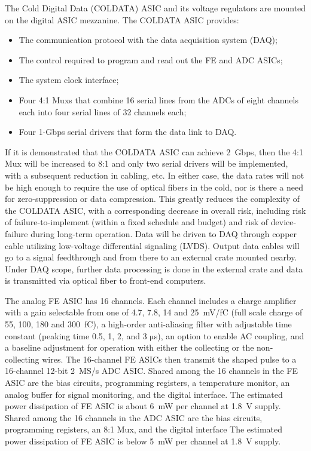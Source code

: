 The Cold Digital Data (COLDATA) ASIC and its voltage regulators are mounted on the digital ASIC mezzanine.
The COLDATA ASIC provides:
\begin{itemize}
\item The communication protocol with the data acquisition system (DAQ);
\item The control required to program and read out the FE and ADC ASICs;
\item The system clock interface;
\item Four 4:1 Muxs that combine 16 serial lines from the ADCs of eight channels each
into four serial lines of 32 channels each;
\item Four 1-Gbps serial drivers that form the data link to DAQ.
\end{itemize}
If it is demonstrated that the COLDATA ASIC can achieve 2~Gbps,
then the 4:1 Mux will be increased to 8:1 and only two serial drivers will be implemented,
with a subsequent reduction in cabling, etc.
In either case, the data rates will not be high enough to require the use of optical fibers in the cold,
nor is there a need for zero-suppression or data compression.
This greatly reduces the complexity of the COLDATA ASIC, with a corresponding decrease in overall risk,
including risk of failure-to-implement (within a fixed schedule and budget)
and risk of device-failure during long-term operation.
Data will be driven to DAQ through copper cable utilizing low-voltage differential signaling (LVDS).
Output data cables will go to a signal feedthrough and from there to an external crate mounted nearby.
Under DAQ scope, further data processing is done in the external crate
and data is transmitted via optical fiber to front-end computers.

The analog FE ASIC has 16 channels.
Each channel includes a charge amplifier with a gain selectable from one of 4.7, 7.8, 14 and 25~mV/fC
(full scale charge of 55, 100, 180 and 300~fC),
a high-order anti-aliasing filter with adjustable time
constant (peaking time 0.5, 1, 2, and 3 $\mathrm{\mu}$s),
an option to enable AC coupling,
and a baseline adjustment for operation with either the collecting or the non-collecting wires.
The 16-channel FE ASICs then transmit the shaped pulse to a 16-channel 12-bit 2~MS/s ADC ASIC.
Shared among the 16 channels in the FE ASIC are the bias circuits, programming registers,
a temperature monitor, an analog buffer for signal monitoring, and the digital interface.
The estimated power dissipation of FE ASIC is about 6~mW per channel at 1.8~V supply.
Shared among the 16 channels in the ADC ASIC are the bias circuits, programming registers,
an 8:1 Mux, and the digital interface
The estimated power dissipation of FE ASIC is below 5~mW per channel at 1.8~V supply.

